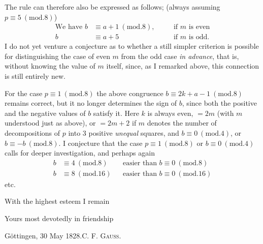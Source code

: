 \par{}The rule can therefore also be expressed as follows; (always assuming $p\equiv5\ (\mathrm{mod}.8)$)
\[
\begin{aligned}
\text{We have }b&\equiv a+1\ (\mathrm{mod}.8),&\quad&\text{if }m\text{ is even}\\
b&\equiv a+5&&\text{if }m\text{ is odd.}
\end{aligned}
\]
I do not yet venture a conjecture as to whether a still simpler criterion is possible for distinguishing the case of even $m$ from the odd case \textit{in advance}, that is, without knowing the value of $m$ itself, since, as I remarked above, this connection is still entirely new.
\newpage
\par For the case $p\equiv1\ (\mathrm{mod}.8)$ the above congruence $b\equiv2k+a-1\ (\mathrm{mod}.8)$ remains correct, but it no longer determines the sign of $b$, since both the positive and the negative values of $b$ satisfy it. Here $k$ is always even, $=2m$ (with $m$ understood just as above), or $=2m+2$ if $m$ denotes the number of decompositions of $p$ into 3 positive \textit{unequal} squares, and $b\equiv0\ (\mathrm{mod}.4)$, or $b\equiv-b\ (\mathrm{mod}.8)$. I conjecture that the case $p\equiv1\ (\mathrm{mod}.8)$ or $b\equiv0\ (\mathrm{mod}.4)$ calls for deeper investigation, and perhaps again
\[
\begin{aligned}
b&\equiv4\ (\mathrm{mod}.8)&&\text{easier than }b\equiv0\ (\mathrm{mod}.8)\\
b&\equiv8\ (\mathrm{mod}.16)&&\text{easier than }b\equiv0\ (\mathrm{mod}.16)
\end{aligned}
\]
etc.
\par{}With the highest esteem I remain
\par\nobreak\noindent\hfill Yours most devotedly in friendship
\par\nobreak\noindent Göttingen, 30 May 1828.\hfill C. F. \textsc{Gauss}.
